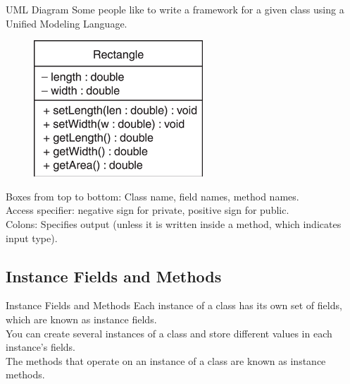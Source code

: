 \documentclass[11pt]{beamer}
\begin{document}
\begin{frame}{UML Diagram}
\footnotesize
    Some people like to write a framework for a given class using a Unified Modeling Language.
    \noindent 
    \begin{figure}[H]
    \centering
    \includegraphics[scale=0.9]{Images/chapter06_ModelLanguage.png}
    \end{figure}
    Boxes from top to bottom: Class name, field names, method names. \\ \vspace{1em}
    Access specifier: negative sign for private, positive sign for public. \\ \vspace{1em} 
    Colons: Specifies output (unless it is written inside a method, which indicates input type).
\end{frame}

\subsection{Instance Fields and Methods}
\begin{frame}{Instance Fields and Methods}
    Each instance of a class has its own set of fields, which are known as instance fields. \\ \vspace{1em} 
    You can create several instances of a class and store different values in each instance’s fields. \\ \vspace{1em} 
    The methods that operate on an instance of a class are known as instance methods.
\end{frame}
\end{document}
